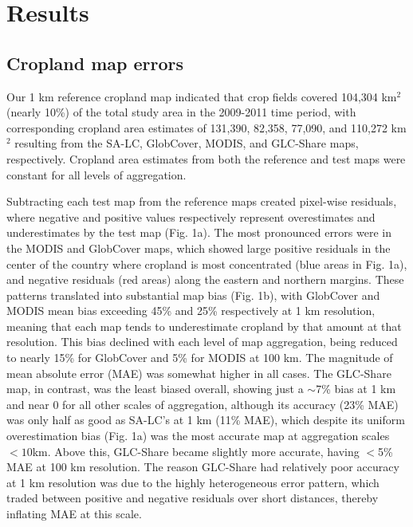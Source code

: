 \documentclass[12 pt, titlepage, a4paper]{article}
\begin{document}
\vspace{-0.5 cm}
\section*{Results}
\vspace{-0.3 cm}
\subsection*{Cropland map errors}
\vspace{-0.2 cm}
Our 1 km reference cropland map indicated that crop fields covered 104,304 km$^2$ (nearly 10\%) of the total study area in the 2009-2011 time period, with corresponding cropland area estimates of 131,390, 82,358, 77,090, and 110,272 km$^2$ resulting from the SA-LC, GlobCover, MODIS, and GLC-Share maps, respectively. Cropland area estimates from both the reference and test maps were constant for all levels of aggregation. 

Subtracting each test map from the reference maps created pixel-wise residuals, where negative and positive values respectively represent overestimates and underestimates by the test map (Fig. 1a). The most pronounced errors were in the MODIS and GlobCover maps, which showed large positive residuals in the center of the country where cropland is most concentrated (blue areas in Fig. 1a), and negative residuals (red areas) along the eastern and northern margins.
These patterns translated into substantial map bias (Fig. 1b), with GlobCover and MODIS mean bias exceeding 45\% and 25\% respectively at 1 km resolution, meaning that each map tends to underestimate cropland by that amount at that resolution. This bias declined with each level of map aggregation, being reduced to nearly 15\% for GlobCover and 5\% for MODIS at 100 km. The magnitude of mean absolute error (MAE) was somewhat higher in all cases. The GLC-Share map, in contrast, was the least biased overall, showing just a $\sim$7\% bias at 1 km and near 0 for all other scales of aggregation, although its accuracy (23\% MAE) was only half as good as SA-LC's at 1 km (11\% MAE), which despite its uniform overestimation bias (Fig. 1a) was the most accurate map at aggregation scales $<10$km. Above this, GLC-Share became slightly more accurate, having $<$5\% MAE at 100 km resolution. The reason GLC-Share had relatively poor accuracy at 1 km resolution was due to the highly heterogeneous error pattern, which traded between positive and negative residuals over short distances, thereby inflating MAE at this scale.  
\end{document}
